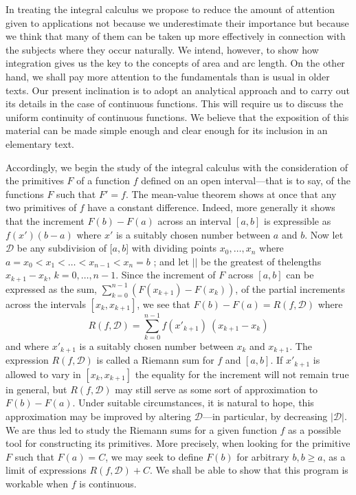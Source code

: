 In treating the integral calculus we propose to reduce the amount of
attention given to applications not because we underestimate their
importance but because we think that many of them can be taken up more
effectively in connection with the subjects where they occur
naturally. We intend, however, to show how integration gives us the
key to the concepts of area and arc length. On the other hand, we
shall pay more attention to the fundamentals than is usual in older
texts. Our present inclination is to adopt an analytical approach and
to carry out its details in the case of continuous functions. This
will require us to discuss the uniform continuity of continuous
functions. We believe that the exposition of this material can be made
simple enough and clear enough for its inclusion in an elementary text.

Accordingly, we begin the study of the integral calculus with the
consideration of the primitives $F$ of a function $f$ defined on an
open interval---that is to say, of the functions $F$ such that
$F'=f$. The mean-value theorem shows at once that any two primitives
of $f$ have a constant difference. Indeed, more generally it shows
that the increment $F(b) - F(a)$ across an interval $[a,b]$ is
expressible as $f(x') (b-a)$ where $x'$ is a suitably chosen number
between $a$ and $b$. Now let $\mathscr{D}$ be any subdivision of [$a,b$]
with dividing points $x_0, \ldots, x_n$ where $a = x_0 < x_1 < \ldots
< x_{n-1} < x_n = b$ ;  and let $|\mathscr|$ be the greatest of
the\pageoriginale lengths $x_{k+1} - x_k$, $k=0, \ldots, n -1$. Since
the increment of $F$ across $[a,b]$ can be expressed as the sum,
$\sum\limits^{n-1}_{k=0} (F(x_{k+1}) - F(x_k))$, of the partial
increments across the intervals $[x_k, x_{k+1}]$, we see that $F(b) -
F(a) = R(f,\mathscr{D})$ where 
$$
R(f, \mathscr{D}) = \sum\limits^{n-1}_{k=0} f(x'_{k+1}) ~ (x_{k+1} - x_k)
$$
and where $x'_{k+1}$ is a suitably chosen number between $x_k$ and
$x_{k+1}$. The expression $R(f, \mathscr{D})$ is called a Riemann sum
for $f$ and $[a,b]$. If $x'_{k+1}$ is allowed to vary in $[x_k,
  x_{k+1}]$ the equality for the increment will not remain true in
general, but $R(f, \mathscr{D})$ may still serve  as some sort of
approximation to $F(b) - F(a)$. Under suitable circumstances, it is
natural to hope, this approximation may be improved by altering
$\mathscr{D}$---in particular, by decreasing $|\mathscr{D}|$. We are
thus led to study the Riemann sums for a given function $f$ as a
possible tool for constructing its primitives. More precisely, when
looking for the primitive $F$ such that $F(a) = C$, we may seek to
define $F(b)$ for arbitrary $b, b \geqslant a$, as a limit of
expressions $R(f, \mathscr{D}) + C$. We shall be able to show that
this program is workable when $f$ is continuous.

